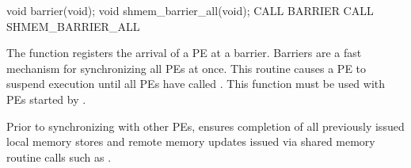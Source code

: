 \synC   %
void barrier(void);
void shmem_barrier_all(void);
\synF   %
CALL BARRIER
CALL SHMEM_BARRIER_ALL
{   
    The  function registers the arrival of a \ac{PE} at a
    barrier. Barriers are a fast mechanism for synchronizing all \ac{PE}s at
    once. This routine causes a \ac{PE} to suspend execution until all \ac{PE}s have
    called . This function must be used with \ac{PE}s started
    by .

    Prior to synchronizing with other \ac{PE}s,  ensures
    completion of all previously issued local memory stores and remote
    memory updates issued via shared memory routine calls such as
    .
}
{
}
\eAPI 
%
% 
% 
% 
% 
% 
% 
% 
% 
% 
% 
% 
% 
% 
% 
%        

